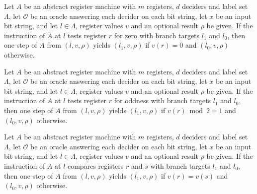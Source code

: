 \begin{lemma}
\label{Complexity.LogProg.astep_jz}
\leanok
{}
Let $A$ be an abstract register machine with $m$ registers, $d$ deciders and label set
$\Lambda$, let $\mathcal{O}$ be an oracle answering each decider on each bit string, let
$x$ be an input bit string, and let $l\in\Lambda$, register values $v$ and an optional
result $\rho$ be given. If the instruction of $A$ at $l$ tests register $r$ for zero with
branch targets $l_1$ and $l_0$, then one step of $A$ from $(l,v,\rho)$ yields
$(l_1,v,\rho)$ if $v(r)=0$ and $(l_0,v,\rho)$ otherwise.
\end{lemma}

\begin{lemma}
\label{Complexity.LogProg.astep_jodd}
\leanok
{}
Let $A$ be an abstract register machine with $m$ registers, $d$ deciders and label set
$\Lambda$, let $\mathcal{O}$ be an oracle answering each decider on each bit string, let
$x$ be an input bit string, and let $l\in\Lambda$, register values $v$ and an optional
result $\rho$ be given. If the instruction of $A$ at $l$ tests register $r$ for oddness
with branch targets $l_1$ and $l_0$, then one step of $A$ from $(l,v,\rho)$ yields
$(l_1,v,\rho)$ if $v(r)\bmod 2=1$ and $(l_0,v,\rho)$ otherwise.
\end{lemma}

\begin{lemma}
\label{Complexity.LogProg.astep_jeq}
\leanok
{}
Let $A$ be an abstract register machine with $m$ registers, $d$ deciders and label set
$\Lambda$, let $\mathcal{O}$ be an oracle answering each decider on each bit string, let
$x$ be an input bit string, and let $l\in\Lambda$, register values $v$ and an optional
result $\rho$ be given. If the instruction of $A$ at $l$ compares registers $r$ and $s$
with branch targets $l_1$ and $l_0$, then one step of $A$ from $(l,v,\rho)$ yields
$(l_1,v,\rho)$ if $v(r)=v(s)$ and $(l_0,v,\rho)$ otherwise.
\end{lemma}

